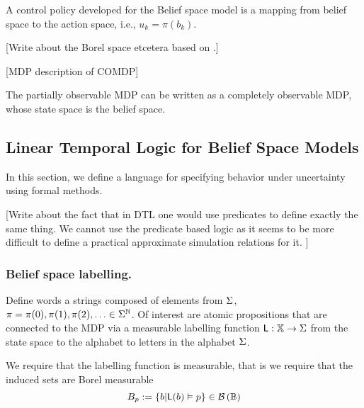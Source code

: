 \documentclass{ifacconf}
\newcommand{\red}[1]{{\color{red} #1}}
\begin{document}
A control policy developed for the Belief space model is a mapping from belief space to the action space, i.e., $u_k=\pi(b_k)$. 

\red{[Write about the Borel space etcetera based on \cite{bertsekas2004stochastic}.]}



\red{[MDP description of COMDP]}

 The partially observable MDP can be written as a completely observable MDP, whose state space is the belief space.

\subsection{Linear Temporal Logic for Belief Space Models}

	In this section, we define a language for specifying behavior under uncertainty using formal methods. 
	
	
	\red{[Write about the fact that in DTL one would use predicates to define exactly the same thing. We cannot use the predicate based logic as it seems to be more difficult to define a practical approximate simulation relations for it. ]}
	
    
    
	\subsubsection{Belief space labelling.}\label{sec:DTL}  
Define words a strings composed of elements from $\Sigma$, $\pi=\pi(0),\pi(1),\pi(2),\ldots\in\Sigma^{\mathbb{N}}$.
Of interest are atomic propositions that are connected to the MDP via a measurable labelling function $\mathsf{L}:\mathbb X\rightarrow \Sigma$ from the state space to the alphabet to letters in the alphabet $\Sigma$. 

%
     We require that the labelling function is measurable, that is we require that the induced sets  are Borel measurable
     \[B_p:=\{b|\mathsf{L}(b)\vDash p \}\in \mathcal{B}\left(\mathbb B\right)\] 
     
\end{document}

